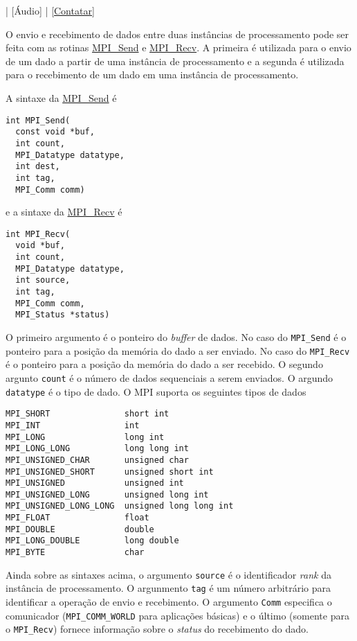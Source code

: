 \begin{flushright}
  [Vídeo] | [Áudio] | \href{https://phkonzen.github.io/notas/contato.html}{[Contatar]}
\end{flushright}

O envio e recebimento de dados entre duas instâncias de processamento pode ser feita com as rotinas \href{https://www.open-mpi.org/doc/current/man3/MPI\_Send.3.php}{MPI\_Send} e \href{https://www.open-mpi.org/doc/current/man3/MPI\_Recv.3.php}{MPI\_Recv}. A primeira é utilizada para o envio de um dado a partir de uma instância de processamento e a segunda é utilizada para o recebimento de um dado em uma instância de processamento.

A sintaxe da \href{https://www.open-mpi.org/doc/current/man3/MPI\_Send.3.php}{MPI\_Send} é
\begin{verbatim}
int MPI_Send(
  const void *buf, 
  int count, 
  MPI_Datatype datatype, 
  int dest,
  int tag, 
  MPI_Comm comm)
\end{verbatim}
e a sintaxe da \href{https://www.open-mpi.org/doc/current/man3/MPI\_Send.3.php}{MPI\_Recv} é
\begin{verbatim}
int MPI_Recv(
  void *buf, 
  int count, 
  MPI_Datatype datatype,
  int source, 
  int tag, 
  MPI_Comm comm, 
  MPI_Status *status)
\end{verbatim}

O primeiro argumento é o ponteiro do {\it buffer} de dados. No caso do \verb+MPI_Send+ é o ponteiro para a posição da memória do dado a ser enviado. No caso do \verb+MPI_Recv+ é o ponteiro para a posição da memória do dado a ser recebido. O segundo argunto \verb+count+ é o número de dados sequenciais a serem enviados. O argundo \verb+datatype+ é o tipo de dado. O MPI suporta os seguintes tipos de dados
\begin{verbatim}
MPI_SHORT               short int
MPI_INT                 int
MPI_LONG                long int
MPI_LONG_LONG           long long int
MPI_UNSIGNED_CHAR       unsigned char
MPI_UNSIGNED_SHORT      unsigned short int
MPI_UNSIGNED            unsigned int
MPI_UNSIGNED_LONG       unsigned long int
MPI_UNSIGNED_LONG_LONG  unsigned long long int
MPI_FLOAT               float
MPI_DOUBLE              double
MPI_LONG_DOUBLE         long double
MPI_BYTE                char
\end{verbatim}

Ainda sobre as sintaxes acima, o argumento \verb+source+ é o identificador {\it rank} da instância de processamento. O argunmento \verb+tag+ é um número arbitrário para identificar a operação de envio e recebimento. O argumento \verb+Comm+ especifica o comunicador (\verb+MPI_COMM_WORLD+ para aplicações básicas) e o último (somente para o \verb+MPI_Recv+) fornece informação sobre o {\it status} do recebimento do dado.


